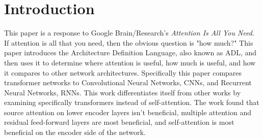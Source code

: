 \section{Introduction}

This paper is a response to Google Brain/Research's \textit{Attention Is All You 
Need}. If attention is all that you need, then the obvious question is "how
much?" This paper introduces the Architecture Definition Language, also known as
ADL, and then uses it to determine where attention is useful, how much is
useful, and how it compares to other network architectures. Specifically this
paper compares transformer networks to Convolutional Neural Networks, CNNs, and
Recurrent Neural Networks, RNNs. This work differentiates itself from other
works by examining specifically transformers instead of self-attention. The work
found that source attention on lower encoder layers isn't beneficial, multiple
attention and residual feed-forward layers are most beneficial, and
self-attention is most beneficial on the encoder side of the network. 
